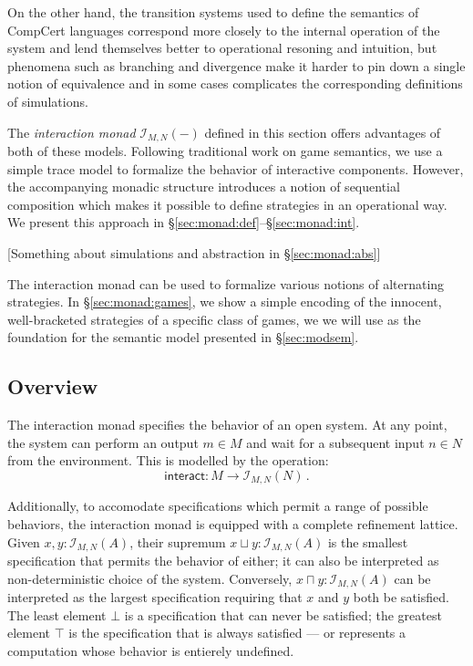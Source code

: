 \documentclass[acmsmall,timestamp,review]{acmart}
\newcommand{\kw}[1]{\ensuremath{ \mathsf{#1} }}
\begin{document}
On the other hand,
the transition systems
used to define the semantics of CompCert languages
correspond more closely to the internal operation of the system
and lend themselves better
to operational resoning and intuition,
but phenomena such as branching and divergence
make it harder to pin down a single notion of equivalence \cite{blts}
and in some cases complicates the corresponding definitions of simulations.

The \emph{interaction monad} $\mathcal{I}_{M,N}(-)$
defined in this section offers advantages of both of these models.
Following traditional work on game semantics,
we use a simple trace model to formalize
the behavior of interactive components.
However,
the accompanying monadic structure
introduces a notion of sequential composition
which makes it possible to define strategies
in an operational way.
We present this approach in \S\ref{sec:monad:def}--\S\ref{sec:monad:int}.

[Something about simulations and abstraction in \S\ref{sec:monad:abs}]

The interaction monad
can be used to formalize various notions of alternating strategies.
In \S\ref{sec:monad:games},
we show a simple encoding of the
innocent, well-bracketed strategies
of a specific class of games,
we we will use as the foundation for
the semantic model presented in \S\ref{sec:modsem}.


\subsection{Overview} \label{sec:monad:overview} %

The interaction monad specifies
the behavior of an open system.
At any point,
the system can perform an output $m \in M$ and
wait for a subsequent input $n \in N$ from the environment.
This is modelled by the operation:
\[
    \kw{interact} : M \rightarrow \mathcal{I}_{M,N}(N) \,.
\]

Additionally,
to accomodate specifications which permit a range of possible behaviors,
the interaction monad is equipped with a complete refinement lattice.
Given $x, y : \mathcal{I}_{M,N}(A)$,
their supremum $x \sqcup y : \mathcal{I}_{M,N}(A)$
is the smallest specification that permits the behavior of either;
it can also be interpreted as non-deterministic choice
of the system.
Conversely, $x \sqcap y : \mathcal{I}_{M,N}(A)$ can be interpreted as
the largest specification requiring that $x$ and $y$ both be satisfied.
The least element $\bot$
is a specification that can never be satisfied;
the greatest element $\top$
is the specification that is always satisfied ---
or represents a computation whose behavior is entierely undefined.
\end{document}
